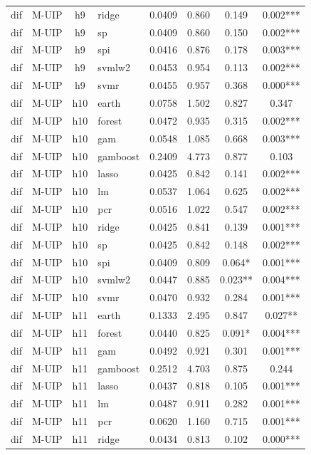 \begin{ThreePartTable}
\begin{longtable}[t]{llclcccc}
dif & M-UIP & h9 & ridge & 0.0409 & 0.860 & 0.149 & 0.002***\\
dif & M-UIP & h9 & sp & 0.0409 & 0.860 & 0.150 & 0.002***\\
dif & M-UIP & h9 & spi & 0.0416 & 0.876 & 0.178 & 0.003***\\
dif & M-UIP & h9 & svmlw2 & 0.0453 & 0.954 & 0.113 & 0.002***\\
dif & M-UIP & h9 & svmr & 0.0455 & 0.957 & 0.368 & 0.000***\\
\addlinespace
dif & M-UIP & h10 & earth & 0.0758 & 1.502 & 0.827 & 0.347\\
dif & M-UIP & h10 & forest & 0.0472 & 0.935 & 0.315 & 0.002***\\
dif & M-UIP & h10 & gam & 0.0548 & 1.085 & 0.668 & 0.003***\\
dif & M-UIP & h10 & gamboost & 0.2409 & 4.773 & 0.877 & 0.103\\
dif & M-UIP & h10 & lasso & 0.0425 & 0.842 & 0.141 & 0.002***\\
dif & M-UIP & h10 & lm & 0.0537 & 1.064 & 0.625 & 0.002***\\
dif & M-UIP & h10 & pcr & 0.0516 & 1.022 & 0.547 & 0.002***\\
dif & M-UIP & h10 & ridge & 0.0425 & 0.841 & 0.139 & 0.001***\\
dif & M-UIP & h10 & sp & 0.0425 & 0.842 & 0.148 & 0.002***\\
dif & M-UIP & h10 & spi & 0.0409 & 0.809 & 0.064* & 0.001***\\
dif & M-UIP & h10 & svmlw2 & 0.0447 & 0.885 & 0.023** & 0.004***\\
dif & M-UIP & h10 & svmr & 0.0470 & 0.932 & 0.284 & 0.001***\\
\addlinespace
dif & M-UIP & h11 & earth & 0.1333 & 2.495 & 0.847 & 0.027**\\
dif & M-UIP & h11 & forest & 0.0440 & 0.825 & 0.091* & 0.004***\\
dif & M-UIP & h11 & gam & 0.0492 & 0.921 & 0.301 & 0.001***\\
dif & M-UIP & h11 & gamboost & 0.2512 & 4.703 & 0.875 & 0.244\\
dif & M-UIP & h11 & lasso & 0.0437 & 0.818 & 0.105 & 0.001***\\
dif & M-UIP & h11 & lm & 0.0487 & 0.911 & 0.282 & 0.001***\\
dif & M-UIP & h11 & pcr & 0.0620 & 1.160 & 0.715 & 0.001***\\
dif & M-UIP & h11 & ridge & 0.0434 & 0.813 & 0.102 & 0.000***\\

\end{longtable}
\end{ThreePartTable}
